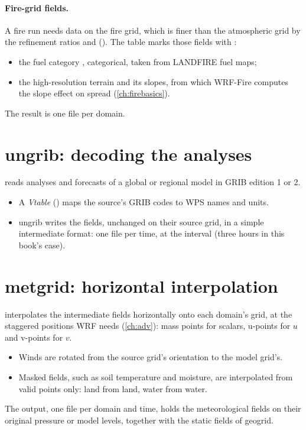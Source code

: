 \paragraph{Fire-grid fields.} A fire run needs data on the fire grid, which is finer than the atmospheric grid by the
refinement ratios  and  (). The table
 marks those fields with :
\begin{itemize}
  \item the fuel category , categorical, taken from LANDFIRE fuel maps;
  \item the high-resolution terrain and its slopes, from which WRF-Fire computes the slope effect on spread
    (\cref{ch:firebasics}).
\end{itemize}

The result is one file  per domain.

\section{ungrib: decoding the analyses}

 reads analyses and forecasts of a global or regional model in GRIB edition 1 or 2.
\begin{itemize}
  \item A \emph{Vtable} () maps the source's GRIB codes to WPS names and units.
  \item ungrib writes the fields, unchanged on their source grid, in a simple intermediate format: one file
     per time, at the interval  (three hours in this book's case).
\end{itemize}

\section{metgrid: horizontal interpolation}

 interpolates the intermediate fields horizontally onto each domain's grid, at the staggered
positions WRF needs (\cref{ch:adv}): mass points for scalars, u-points for $u$ and v-points for $v$.
\begin{itemize}
  \item Winds are rotated from the source grid's orientation to the model grid's.
  \item Masked fields, such as soil temperature and moisture, are interpolated from valid points only: land from
    land, water from water.
\end{itemize}
The output, one file  per domain and time, holds the meteorological fields on their original
pressure or model levels, together with the static fields of geogrid.

